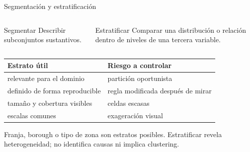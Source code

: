 \documentclass[aspectratio=169,11pt]{beamer}
\begin{document}
\begin{frame}{Segmentación y estratificación}
  \small
  \begin{columns}[T]
      \begin{block}{Segmentar}
        Describir subconjuntos sustantivos.
      \end{block}
      \begin{block}{Estratificar}
        Comparar una distribución o relación dentro de niveles de una tercera variable.
      \end{block}
  \end{columns}
  \vspace{.4em}
  \begin{tabularx}{\textwidth}{X X}
    \toprule
    \textbf{Estrato útil} & \textbf{Riesgo a controlar} \\
    \midrule
    relevante para el dominio & partición oportunista \\
    definido de forma reproducible & regla modificada después de mirar \\
    tamaño y cobertura visibles & celdas escasas \\
    escalas comunes & exageración visual \\
    \bottomrule
  \end{tabularx}
  \vfill
  \centering Franja, borough o tipo de zona son estratos posibles. Estratificar revela heterogeneidad; no identifica causas ni implica clustering.
\end{frame}
\end{document}
